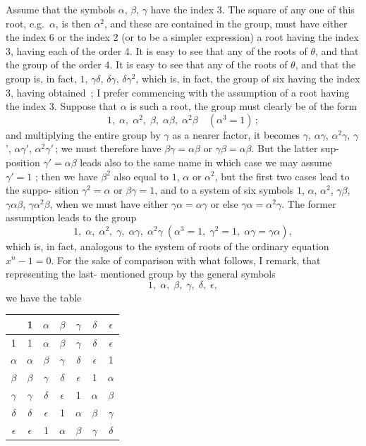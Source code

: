 \documentclass[11pt,a4paper]{article}
\theoremstyle{definition}
\begin{document}
Assume that the symbols $\alpha$, $\beta$, $\gamma$ have the index 3. The square of any one of
this root, e.g.\ $\alpha$, is then $\alpha^2$, and these are contained in the group, must have either
the index 6 or the index 2 (or to be a simpler expression) a root having the index 3, having
each of the order 4. It is easy to see that any of the roots of $\theta$, and that the group
of the order 4. It is easy to see that any of the roots of $\theta$, and that the group
is, in fact, $1$, $\gamma\delta$, $\delta\gamma$, $\delta\gamma^2$, which is, in fact, the group of six having the index 3, having
obtained \,; I prefer commencing with the assumption of a root having the index 3.
Suppose that $\alpha$ is such a root, the group must clearly be of the form
\[
1,\;\alpha,\;\alpha^2,\;\beta,\;\alpha\beta,\;\alpha^2\beta\quad(\alpha^3=1)\,;
\]
and multiplying the entire group by $\gamma$ as a nearer factor, it becomes $\gamma$, $\alpha\gamma$, $\alpha^2\gamma$, $\gamma$',
$\alpha\gamma'$, $\alpha^2\gamma'$\,; we must therefore have $\beta\gamma = \alpha\beta$ or $\gamma\beta = \alpha\beta$. But the latter sup-
position $\gamma' = \alpha\beta$ leads also to the same name in which case we may assume $\gamma' = 1$ ;
then we have $\beta^2$ also equal to $1$, $\alpha$ or $\alpha^2$, but the first two cases lead to the suppo-
sition $\gamma^2 = \alpha$ or $\beta\gamma = 1$, and to a system of six symbols $1$, $\alpha$, $\alpha^2$, $\gamma\beta$, $\gamma\alpha\beta$, $\gamma\alpha^2\beta$,
when we must have either $\gamma\alpha = \alpha\gamma$ or else $\gamma\alpha = \alpha^2\gamma$. The former assumption leads to
the group
\[
1,\;\alpha,\;\alpha^2,\;\gamma,\;\alpha\gamma,\;\alpha^2\gamma\;(\alpha^3=1,\;\gamma^2=1,\;\alpha\gamma=\gamma\alpha),
\]
which is, in fact, analogous to the system of roots of the ordinary equation $x^n - 1 = 0$.
For the sake of comparison with what follows, I remark, that representing the last-
mentioned group by the general symbols
\[
1,\;\alpha,\;\beta,\;\gamma,\;\delta,\;\epsilon,
\]
we have the table
\medskip
\begin{center}
\begin{tabular}{c|cccccc}
 & 1 & $\alpha$ & $\beta$ & $\gamma$ & $\delta$ & $\epsilon$ \\\hline
1 & 1 & $\alpha$ & $\beta$ & $\gamma$ & $\delta$ & $\epsilon$ \\
$\alpha$ & $\alpha$ & $\beta$ & $\gamma$ & $\delta$ & $\epsilon$ & 1 \\
$\beta$ & $\beta$ & $\gamma$ & $\delta$ & $\epsilon$ & 1 & $\alpha$ \\
$\gamma$ & $\gamma$ & $\delta$ & $\epsilon$ & 1 & $\alpha$ & $\beta$ \\
$\delta$ & $\delta$ & $\epsilon$ & 1 & $\alpha$ & $\beta$ & $\gamma$ \\
$\epsilon$ & $\epsilon$ & 1 & $\alpha$ & $\beta$ & $\gamma$ & $\delta$
\end{tabular}
\end{center}
\end{document}
